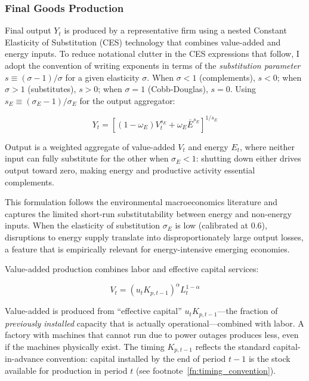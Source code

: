 \documentclass[12pt, a4paper]{article}
\begin{document}
\subsubsection{Final Goods Production}

Final output $Y_t$ is produced by a representative firm using a nested Constant Elasticity of Substitution (CES) technology that combines value-added and energy inputs. To reduce notational clutter in the CES expressions that follow, I adopt the convention of writing exponents in terms of the \textit{substitution parameter} $s \equiv (\sigma - 1)/\sigma$ for a given elasticity $\sigma$. When $\sigma < 1$ (complements), $s < 0$; when $\sigma > 1$ (substitutes), $s > 0$; when $\sigma = 1$ (Cobb-Douglas), $s = 0$. Using $s_E \equiv (\sigma_E - 1)/\sigma_E$ for the output aggregator:

\begin{equation}
Y_t = \left[(1-\omega_E)V_t^{s_E} + \omega_E \bar{E}^{s_E}\right]^{1/s_E}
\label{eq:final_output}
\end{equation}

Output is a weighted aggregate of value-added $V_t$ and energy $E_t$, where neither input can fully substitute for the other when $\sigma_E < 1$: shutting down either drives output toward zero, making energy and productive activity essential complements.

This formulation follows the environmental macroeconomics literature \citep{heutel2012, airaudo2025green} and captures the limited short-run substitutability between energy and non-energy inputs. When the elasticity of substitution $\sigma_E$ is low (calibrated at 0.6), disruptions to energy supply translate into disproportionately large output losses, a feature that is empirically relevant for energy-intensive emerging economies.

Value-added production combines labor and effective capital services:

\begin{equation}
V_t = (u_t K_{p,t-1})^\alpha L_t^{1-\alpha}
\label{eq:value_added}
\end{equation}

Value-added is produced from ``effective capital'' $u_t K_{p,t-1}$---the fraction of \textit{previously installed} capacity that is actually operational---combined with labor. A factory with machines that cannot run due to power outages produces less, even if the machines physically exist. The timing $K_{p,t-1}$ reflects the standard capital-in-advance convention: capital installed by the end of period $t-1$ is the stock available for production in period $t$ (see footnote~\ref{fn:timing_convention}).
\end{document}
